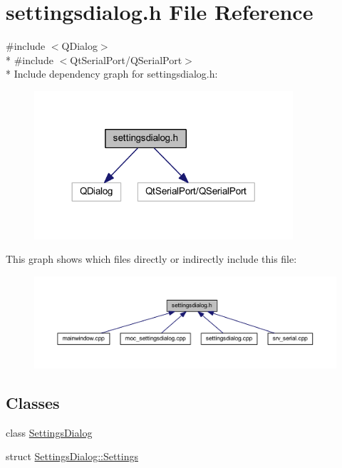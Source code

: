 \hypertarget{a00045}{\section{settingsdialog.\+h File Reference}
\label{a00045}
}
{\ttfamily \#include $<$Q\+Dialog$>$}\\*
{\ttfamily \#include $<$Qt\+Serial\+Port/\+Q\+Serial\+Port$>$}\\*
Include dependency graph for settingsdialog.\+h\+:
\nopagebreak
\begin{figure}[H]
\begin{center}
\leavevmode
\includegraphics[width=272pt]{d3/db1/a00200}
\end{center}
\end{figure}
This graph shows which files directly or indirectly include this file\+:
\nopagebreak
\begin{figure}[H]
\begin{center}
\leavevmode
\includegraphics[width=350pt]{dd/de3/a00201}
\end{center}
\end{figure}
\subsection*{Classes}
\begin{DoxyCompactItemize}
\item 
class \hyperlink{a00022}{Settings\+Dialog}
\item 
struct \hyperlink{a00022_dc/dfe/a00125}{Settings\+Dialog\+::\+Settings}
\end{DoxyCompactItemize}
